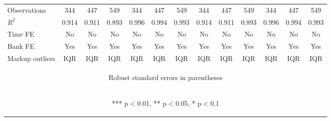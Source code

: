 \documentclass[]{article}
\begin{document}
\begin{center}
\begin{tabular}{lcccccccccccc}
Observations & 344 & 447 & 549 & 344 & 447 & 549 & 344 & 447 & 549 & 344 & 447 & 549 \\
$R^2$ & 0.914 & 0.911 & 0.893 & 0.996 & 0.994 & 0.993 & 0.914 & 0.911 & 0.893 & 0.996 & 0.994 & 0.993 \\
Time FE & No & No & No & No & No & No & No & No & No & No & No & No \\
Bank FE & Yes & Yes & Yes & Yes & Yes & Yes & Yes & Yes & Yes & Yes & Yes & Yes \\
 Markup outliers & IQR & IQR & IQR & IQR & IQR & IQR & IQR & IQR & IQR & IQR & IQR & IQR \\ \hline
\multicolumn{13}{c}{\begin{footnotesize} Robust standard errors in parentheses\end{footnotesize}} \\
\multicolumn{13}{c}{\begin{footnotesize} *** p$<$0.01, ** p$<$0.05, * p$<$0.1\end{footnotesize}} \\
\end{tabular}
\end{center}
\end{document}
